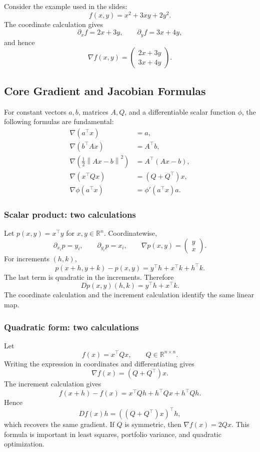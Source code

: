 \documentclass[11pt]{article}
\newcommand{\R}{\mathbb{R}}
\newcommand{\norm}[1]{\left\lVert #1\right\rVert}
\theoremstyle{definition}
\theoremstyle{plain}
\theoremstyle{remark}
\begin{document}
Consider the example used in the slides:
\[
f(x,y)=x^2+3xy+2y^2.
\]
The coordinate calculation gives
\[
\partial_xf=2x+3y,
\qquad
\partial_yf=3x+4y,
\]
and hence
\[
\boxed{\nabla f(x,y)=\begin{pmatrix}2x+3y\\3x+4y\end{pmatrix}.}
\]

\subsection{Core Gradient and Jacobian Formulas}

For constant vectors $a,b$, matrices $A,Q$, and a differentiable scalar
function $\phi$, the following formulas are fundamental:
\[
\begin{aligned}
\nabla(a^\top x)&=a,\\
\nabla(b^\top Ax)&=A^\top b,\\
\nabla\!\left(\tfrac12\norm{Ax-b}^2\right)&=A^\top(Ax-b),\\
\nabla(x^\top Qx)&=(Q+Q^\top)x,\\
\nabla\phi(a^\top x)&=\phi'(a^\top x)a.
\end{aligned}
\]

\subsubsection*{Scalar product: two calculations}

Let $p(x,y)=x^\top y$ for $x,y\in\R^n$. Coordinatewise,
\[
\partial_{x_i}p=y_i,
\qquad
\partial_{y_i}p=x_i,
\qquad
\nabla p(x,y)=\begin{pmatrix}y\\x\end{pmatrix}.
\]
For increments $(h,k)$,
\[
p(x+h,y+k)-p(x,y)
=y^\top h+x^\top k+h^\top k.
\]
The last term is quadratic in the increments. Therefore
\[
\boxed{Dp(x,y)(h,k)=y^\top h+x^\top k.}
\]
The coordinate calculation and the increment calculation identify the same
linear map.

\subsubsection*{Quadratic form: two calculations}

Let
\[
f(x)=x^\top Qx,
\qquad Q\in\R^{n\times n}.
\]
Writing the expression in coordinates and differentiating gives
\[
\nabla f(x)=(Q+Q^\top)x.
\]
The increment calculation gives
\[
f(x+h)-f(x)=x^\top Qh+h^\top Qx+h^\top Qh.
\]
Hence
\[
Df(x)h=((Q+Q^\top)x)^\top h,
\]
which recovers the same gradient. If $Q$ is symmetric, then
$\nabla f(x)=2Qx$.
This formula is important in
least squares, portfolio variance, and quadratic optimization.
\end{document}

